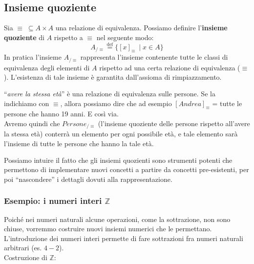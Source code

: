 \documentclass[
  a4paper,
]{article}
\begin{document}
\hypertarget{insieme-quoziente}{%
\subsection{Insieme quoziente}\label{insieme-quoziente}}

Sia \(\equiv \; \subseteq A \times A\) una relazione di equivalenza.
Possiamo definire l'\textbf{insieme quoziente} di \(A\) rispetto a
\(\equiv\) nel seguente modo: \[
A_{/\equiv} \overset{\mathrm{def}}{=} \{[x]_\equiv\ \mid x \in A\}
\] In pratica l'insieme \(A_{/\equiv}\) rappresenta l'insieme contenente
tutte le classi di equivalenza degli elementi di \(A\) rispetto ad una
certa relazione di equivalenza (\(\equiv\)). L'esistenza di tale insieme
è garantita dall'assioma di rimpiazzamento.

\begin{examplebox}[Esempio]

``\emph{avere la stessa età}'' è una relazione di equivalenza sulle
persone. Se la indichiamo con \(\equiv\), allora possiamo dire che ad
esempio \([Andrea]_\equiv\) = tutte le persone che hanno 19 anni. E così
via.\\
Avremo quindi che \(Persone_{/\equiv}\) (l'insieme quoziente delle
persone rispetto all'avere la stessa età) conterrà un elemento per ogni
possibile età, e tale elemento sarà l'insieme di tutte le persone che
hanno la tale età.

\end{examplebox}

Possiamo intuire il fatto che gli insiemi quozienti sono strumenti
potenti che permettono di implementare nuovi concetti a partire da
concetti pre-esistenti, per poi ``nascondere'' i dettagli dovuti alla
rappresentazione.

\hypertarget{esempio-i-numeri-interi-mathbbz}{%
\subsubsection{\texorpdfstring{Esempio: i numeri interi
\(\mathbb{Z}\)}{Esempio: i numeri interi \textbackslash mathbb\{Z\}}}\label{esempio-i-numeri-interi-mathbbz}}

Poiché nei numeri naturali alcune operazioni, come la sottrazione, non
sono chiuse, vorremmo costruire nuovi insiemi numerici che le
permettano.\\
L'introduzione dei numeri interi permette di fare sottrazioni fra numeri
naturali arbitrari (es. \(4 - 2\)).\\
Costruzione di \(\mathbb{Z}\):
\end{document}
